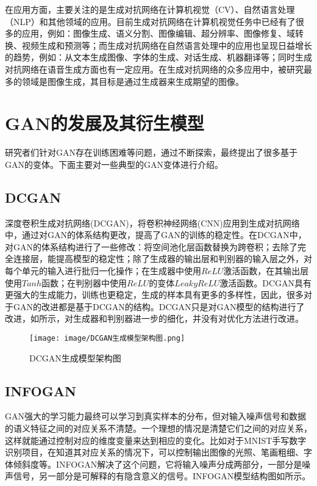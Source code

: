 \documentclass[lang=cn,a4paper,12pt,bibend=biber]{GAN}
\begin{document}
在应用方面，主要关注的是生成对抗网络在计算机视觉（CV）、自然语言处理（NLP）和其他领域的应用。目前生成对抗网络在计算机视觉任务中已经有了很多的应用，例如：图像生成、语义分割、图像编辑、超分辨率、图像修复、域转换、视频生成和预测等；而生成对抗网络在自然语言处理中的应用也呈现日益增长的趋势，例如：从文本生成图像、字体的生成、对话生成、机器翻译等；同时生成对抗网络在语音生成方面也有一定应用。在生成对抗网络的众多应用中，被研究最多的领域是图像生成，其目标是通过生成器来生成期望的图像。


\section{GAN的发展及其衍生模型}

研究者们针对GAN存在训练困难等问题，通过不断探索，最终提出了很多基于GAN的变体。下面主要对一些典型的GAN变体进行介绍。

\subsection{DCGAN}
深度卷积生成对抗网络(DCGAN)，将卷积神经网络(CNN)应用到生成对抗网络中，通过对GAN的体系结构更改，提高了GAN的训练的稳定性。在DCGAN中，对GAN的体系结构进行了一些修改：将空间池化层函数替换为跨卷积；去除了完全连接层，能提高模型的稳定性；除了生成器的输出层和判别器的输入层之外，对每个单元的输入进行批归一化操作；在生成器中使用$ReLU$激活函数，在其输出层使用$Tanh$函数；在判别器中使用$ReLU$的变体$LeakyReLU$激活函数。DCGAN具有更强大的生成能力，训练也更稳定，生成的样本具有更多的多样性，因此，很多对于GAN的改进都是基于DCGAN的结构。DCGAN只是对GAN模型的结构进行了改进，如所示，对生成器和判别器进一步的细化，并没有对优化方法进行改进。

\begin{figure}[!htbp]
  \centering
  \texttt{[image: image/DCGAN生成模型架构图.png]}
  \caption[]{DCGAN生成模型架构图}
  \label{fig:DCGAN生成模型架构图}
\end{figure}

\subsection{INFOGAN}

GAN强大的学习能力最终可以学习到真实样本的分布，但对输入噪声信号和数据的语义特征之间的对应关系不清楚。一个理想的情况是清楚它们之间的对应关系，这样就能通过控制对应的维度变量来达到相应的变化。比如对于MNIST手写数字识别项目，在知道其对应关系的情况下，可以控制输出图像的光照、笔画粗细、字体倾斜度等。INFOGAN解决了这个问题，它将输入噪声分成两部分，一部分是噪声信号，另一部分是可解释的有隐含意义的信号。INFOGAN模型结构图如所示。
\end{document}
